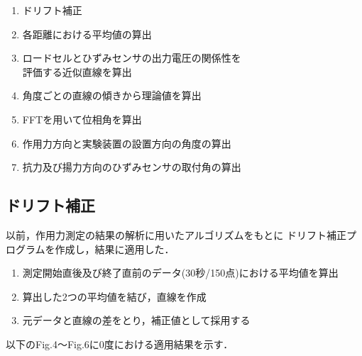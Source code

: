 \documentclass[twocolumn,a4j]{jsarticle}
\begin{document}

    \begin{enumerate}[(1)]
        \item ドリフト補正
        \item 各距離における平均値の算出
        \item ロードセルとひずみセンサの出力電圧の関係性を\\評価する近似直線を算出
        \item 角度ごとの直線の傾きから理論値を算出
        \item FFTを用いて位相角を算出
        \item 作用力方向と実験装置の設置方向の角度の算出
        \item 抗力及び揚力方向のひずみセンサの取付角の算出
    \end{enumerate}

\newpage

\subsection{ドリフト補正}
以前，作用力測定の結果の解析に用いたアルゴリズムをもとに
ドリフト補正プログラムを作成し，結果に適用した．

\begin{enumerate}[(1)]
    \item 測定開始直後及び終了直前のデータ(30秒/150点)における平均値を算出
    \item 算出した2つの平均値を結び，直線を作成
    \item 元データと直線の差をとり，補正値として採用する
\end{enumerate}

以下のFig.4～Fig.6に0度における適用結果を示す．
\end{document}
